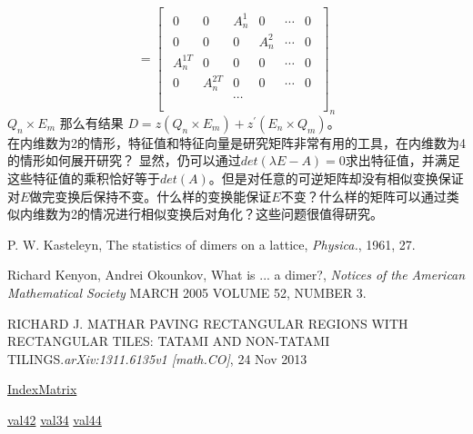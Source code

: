 \documentclass{amsc}          %
\numberwithin{equation}{section} %
\begin{document}
$$= \begin{bmatrix}\begin{smallmatrix}
 0& 0& A^{1}_{n} & 0 &\cdots& 0\\
  0& 0& 0 & A^{2}_{n} &\cdots& 0\\
 A^{1T}_{n} & 0& 0 & 0 &\cdots& 0\\
 0& A^{2T}_{n} & 0 & 0 &\cdots& 0\\
 & & \cdots & &\\
\end{smallmatrix}\end{bmatrix}_{n} $$
$Q_{n}\times E_{m}$
那么有结果
$D=z(Q_{n}\times E_{m})  +  z^{'} (E_{n} \times Q_{m})$。\\
在内维数为2的情形，特征值和特征向量是研究矩阵非常有用的工具，在内维数为4的情形如何展开研究？
显然，仍可以通过$det(\lambda E - A) = 0$求出特征值，并满足这些特征值的乘积恰好等于$det(A)$。但是对任意的可逆矩阵却没有相似变换保证对$E$做完变换后保持不变。什么样的变换能保证$E$不变？什么样的矩阵可以通过类似内维数为2的情况进行相似变换后对角化？这些问题很值得研究。

\BeginRef
{} P. W. Kasteleyn, The statistics of dimers on a lattice, {\it Physica.}, 1961, 27.

 Richard Kenyon, Andrei Okounkov,  What is ... a dimer?, {\it Notices of the American Mathematical Society} MARCH 2005 VOLUME 52, NUMBER 3.

 RICHARD J. MATHAR PAVING RECTANGULAR REGIONS WITH RECTANGULAR TILES: TATAMI AND NON-TATAMI TILINGS.{\it arXiv:1311.6135v1 [math.CO]},  24 Nov 2013

 \href{https://github.com/huih1984/Lattice-Tilings-and-Hyperdeterminant/blob/master/vc\%2B\%2B/high\%20dimension\%20matrix/IndexMatrix.cpp}{IndexMatrix}

 \href{https://github.com/huih1984/Lattice-Tilings-and-Hyperdeterminant/blob/master/vc\%2B\%2B/high\%20dimension\%20matrix/out_4_2_1.txt}{val42}
 \href{https://github.com/huih1984/Lattice-Tilings-and-Hyperdeterminant/blob/master/vc\%2B\%2B/high\%20dimension\%20matrix/out_3_4_1.txt}{val34}
 \href{https://github.com/huih1984/Lattice-Tilings-and-Hyperdeterminant/blob/master/vc\%2B\%2B/high\%20dimension\%20matrix/out_4_4_1.txt}{val44}

\EndRef
\end{document}
